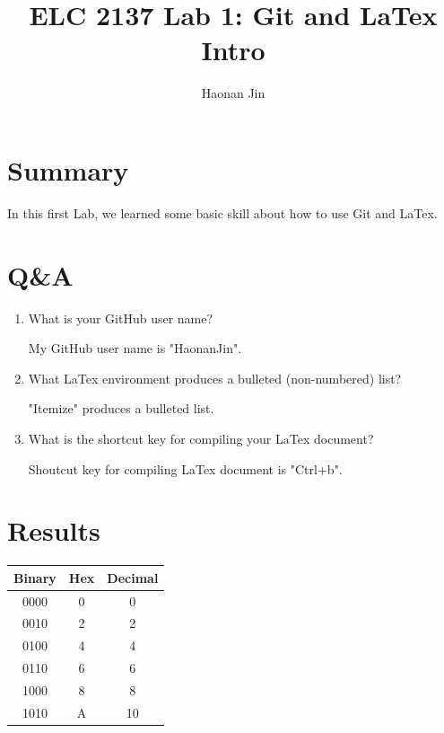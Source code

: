 \documentclass[11pt]{article}
\begin{document}
\title{ELC 2137 Lab 1: Git and LaTex Intro}
\author{Haonan Jin}

\maketitle


\section*{Summary}

In this first Lab, we learned some basic skill about how to use Git and LaTex.   


\section*{Q\&A}

\begin{enumerate}
	\item What is your GitHub user name?
	
	My GitHub user name is "HaonanJin".
	
	\item What LaTex environment produces a bulleted (non-numbered) list?
	
	"Itemize" produces a bulleted list.
	
	\item What is the shortcut key for compiling your LaTex document?
	
	Shoutcut key for compiling LaTex document is "Ctrl+b".
	
\end{enumerate}	
	


\section*{Results}

\begin{center}
\begin{tabular}{c|c|c}
	\toprule
	Binary & Hex & Decimal \\
	\midrule
	0000 & 0 & 0 \\
	0010 & 2 & 2 \\
	0100 & 4 & 4 \\
	0110 & 6 & 6 \\
	1000 & 8 & 8 \\
	1010 & A & 10 \\
	\bottomrule
\end{tabular} 
\end{center}
\end{document}
